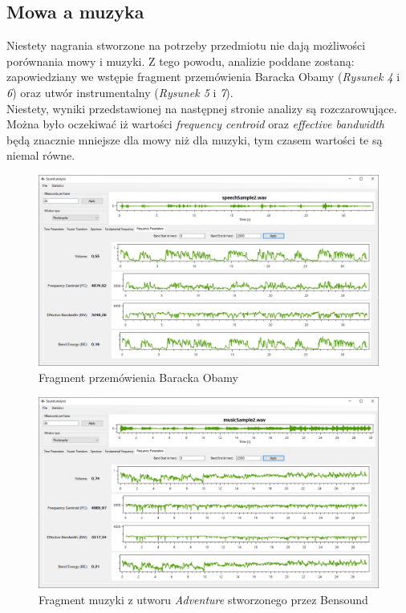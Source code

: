 \documentclass[a4paper]{article}
\begin{document}
\subsection{Mowa a muzyka}
Niestety nagrania stworzone na potrzeby przedmiotu nie dają możliwości porównania mowy i muzyki. Z tego powodu, analizie poddane zostaną: zapowiedziany we wstępie fragment przemówienia Baracka Obamy (\textit{Rysunek 4} i \textit{6}) oraz utwór instrumentalny (\textit{Rysunek 5} i \textit{7}).\\
Niestety, wyniki przedstawionej na następnej stronie analizy są rozczarowujące. Można było oczekiwać iż wartości \textit{frequency centroid} oraz \textit{effective bandwidth} będą znacznie mniejsze dla mowy niż dla muzyki, tym czasem wartości te są niemal równe.
\begin{figure}[H]
  \includegraphics[width=\linewidth]{images/04speech.png}
  \caption{Fragment przemówienia Baracka Obamy}
\end{figure}
\begin{figure}[H]
  \includegraphics[width=\linewidth]{images/05music.png}
  \caption{Fragment muzyki z utworu \textit{Adventure} stworzonego przez Bensound}
\end{figure}
\end{document}
